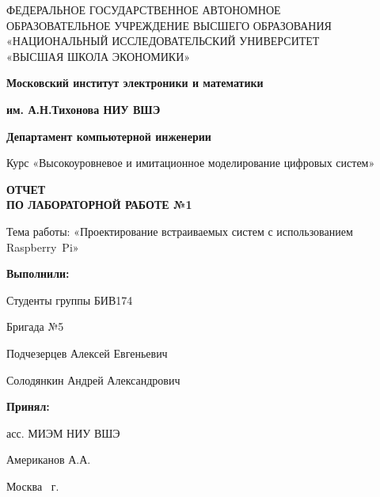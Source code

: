 \begin{titlepage}
    \begin{center}
        ФЕДЕРАЛЬНОЕ ГОСУДАРСТВЕННОЕ АВТОНОМНОЕ \\
        ОБРАЗОВАТЕЛЬНОЕ УЧРЕЖДЕНИЕ ВЫСШЕГО ОБРАЗОВАНИЯ\\
        «НАЦИОНАЛЬНЫЙ ИССЛЕДОВАТЕЛЬСКИЙ УНИВЕРСИТЕТ\\
        «ВЫСШАЯ ШКОЛА ЭКОНОМИКИ»
    \end{center}

    \begin{center}
        \textbf{Московский институт электроники и математики}

        \textbf{им. А.Н.Тихонова НИУ ВШЭ}

        \vspace{2ex}

        \textbf{Департамент компьютерной инженерии}
    \end{center}
    \vspace{1ex}

    \begin{center}
        Курс «Высокоуровневое и имитационное моделирование цифровых систем»
    \end{center}


    \begin{center}
        \textbf{ОТЧЕТ\\
        ПО ЛАБОРАТОРНОЙ РАБОТЕ №1
        }
    \end{center}

    \begin{center}
        Тема работы: «Проектирование встраиваемых систем с использованием Raspberry~Pi»
    \end{center}

    \vspace{2ex}

    \begin{flushright}
        \textbf{Выполнили:}

        \vspace{2ex}

        Студенты группы БИВ174

        Бригада №5

        \vspace{2ex}

        Подчезерцев Алексей Евгеньевич

        Солодянкин Андрей Александрович
        \vspace{2ex}

        \textbf{Принял:}

        асс. МИЭМ НИУ ВШЭ

        Американов А.А.

    \end{flushright}

    \vfill
    \begin{center}
        Москва \the\year \, г.
    \end{center}

\end{titlepage}
\addtocounter{page}{1}
